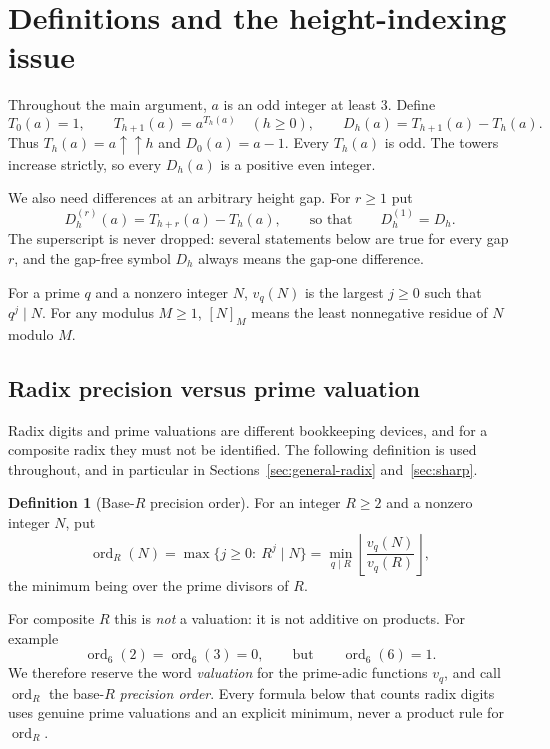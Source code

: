 \documentclass[11pt,letterpaper]{article}
\numberwithin{equation}{section}
\theoremstyle{definition}
\newtheorem{definition}[theorem]{Definition}
\theoremstyle{remark}
\newcommand{\floor}[1]{\left\lfloor #1\right\rfloor}
\DeclareMathOperator{\ordop}{ord}
\begin{document}
\section{Definitions and the height-indexing issue}\label{sec:notation}

Throughout the main argument, $a$ is an odd integer at least $3$. Define
\begin{equation}\label{eq:towers}
 T_0(a)=1,\qquad T_{h+1}(a)=a^{T_h(a)}\quad(h\ge0),
 \qquad D_h(a)=T_{h+1}(a)-T_h(a).
\end{equation}
Thus $T_h(a)=a\uparrow\uparrow h$ and $D_0(a)=a-1$. Every $T_h(a)$ is odd. The towers increase strictly, so every $D_h(a)$ is a positive even integer.

We also need differences at an arbitrary height gap. For $r\ge1$ put
\begin{equation}\label{eq:gapdiff}
 D_h^{(r)}(a)=T_{h+r}(a)-T_h(a),\qquad\text{so that}\qquad D_h^{(1)}=D_h .
\end{equation}
The superscript is never dropped: several statements below are true for every gap $r$, and the gap-free symbol $D_h$ always means the gap-one difference.

For a prime $q$ and a nonzero integer $N$, $v_q(N)$ is the largest $j\ge0$ such that $q^j\mid N$. For any modulus $M\ge1$, $[N]_M$ means the least nonnegative residue of $N$ modulo $M$.

\subsection{Radix precision versus prime valuation}\label{sec:precision-order}

Radix digits and prime valuations are different bookkeeping devices, and for a composite radix they must not be identified. The following definition is used throughout, and in particular in Sections~\ref{sec:general-radix} and~\ref{sec:sharp}.

\begin{definition}[Base-$R$ precision order]\label{def:ord}
For an integer $R\ge2$ and a nonzero integer $N$, put
\begin{equation}\label{eq:ordR}
 \ordop_R(N)=\max\{j\ge0:\ R^j\mid N\}
 =\min_{q\mid R}\floor{\frac{v_q(N)}{v_q(R)}},
\end{equation}
the minimum being over the prime divisors of $R$.
\end{definition}

For composite $R$ this is \emph{not} a valuation: it is not additive on products. For example
\[
 \ordop_6(2)=\ordop_6(3)=0,\qquad\text{but}\qquad \ordop_6(6)=1 .
\]
We therefore reserve the word \emph{valuation} for the prime-adic functions $v_q$, and call $\ordop_R$ the base-$R$ \emph{precision order}. Every formula below that counts radix digits uses genuine prime valuations and an explicit minimum, never a product rule for $\ordop_R$.
\end{document}
